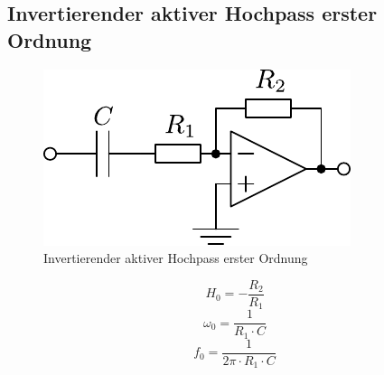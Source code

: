 



\subsection{Invertierender aktiver Hochpass erster Ordnung}
\begin{figure}[h!]
	\centering
	\includegraphics[scale=\schscale]{op_hp_o1_inv.pdf}
	\caption{Invertierender aktiver Hochpass erster Ordnung}
	\label{sch:op-hp-o1-inv}
\end{figure}
\[ H_0 = - \frac{R_2}{R_1} \]
\[ \omega_0 = \frac{1}{R_1 \cdot C} \]
\[ f_0 = \frac{1}{2 \pi \cdot R_1 \cdot C} \]